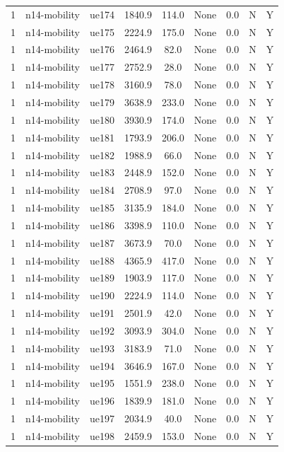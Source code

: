 \begin{table}[ht]
\begin{tabular}{|c|c|c|c|c|c|c|c|c|}
1 & n14-mobility & ue174 & 1840.9 & 114.0 & None & 0.0 & N & Y \\
1 & n14-mobility & ue175 & 2224.9 & 175.0 & None & 0.0 & N & Y \\
1 & n14-mobility & ue176 & 2464.9 & 82.0 & None & 0.0 & N & Y \\
1 & n14-mobility & ue177 & 2752.9 & 28.0 & None & 0.0 & N & Y \\
1 & n14-mobility & ue178 & 3160.9 & 78.0 & None & 0.0 & N & Y \\
1 & n14-mobility & ue179 & 3638.9 & 233.0 & None & 0.0 & N & Y \\
1 & n14-mobility & ue180 & 3930.9 & 174.0 & None & 0.0 & N & Y \\
1 & n14-mobility & ue181 & 1793.9 & 206.0 & None & 0.0 & N & Y \\
1 & n14-mobility & ue182 & 1988.9 & 66.0 & None & 0.0 & N & Y \\
1 & n14-mobility & ue183 & 2448.9 & 152.0 & None & 0.0 & N & Y \\
1 & n14-mobility & ue184 & 2708.9 & 97.0 & None & 0.0 & N & Y \\
1 & n14-mobility & ue185 & 3135.9 & 184.0 & None & 0.0 & N & Y \\
1 & n14-mobility & ue186 & 3398.9 & 110.0 & None & 0.0 & N & Y \\
1 & n14-mobility & ue187 & 3673.9 & 70.0 & None & 0.0 & N & Y \\
1 & n14-mobility & ue188 & 4365.9 & 417.0 & None & 0.0 & N & Y \\
1 & n14-mobility & ue189 & 1903.9 & 117.0 & None & 0.0 & N & Y \\
1 & n14-mobility & ue190 & 2224.9 & 114.0 & None & 0.0 & N & Y \\
1 & n14-mobility & ue191 & 2501.9 & 42.0 & None & 0.0 & N & Y \\
1 & n14-mobility & ue192 & 3093.9 & 304.0 & None & 0.0 & N & Y \\
1 & n14-mobility & ue193 & 3183.9 & 71.0 & None & 0.0 & N & Y \\
1 & n14-mobility & ue194 & 3646.9 & 167.0 & None & 0.0 & N & Y \\
1 & n14-mobility & ue195 & 1551.9 & 238.0 & None & 0.0 & N & Y \\
1 & n14-mobility & ue196 & 1839.9 & 181.0 & None & 0.0 & N & Y \\
1 & n14-mobility & ue197 & 2034.9 & 40.0 & None & 0.0 & N & Y \\
1 & n14-mobility & ue198 & 2459.9 & 153.0 & None & 0.0 & N & Y \\

\end{tabular}
\end{table}

